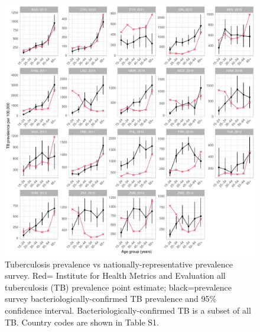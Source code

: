 \documentclass[12pt]{article}
\begin{document}
\begin{figure}
\centering
\includegraphics[width=1\textwidth]{../plots/aF3.pdf}
\caption[Prevalence vs prevalence survey.]{Tuberculosis prevalence vs
  nationally-representative prevalence survey. Red= Institute for Health Metrics
  and Evaluation all tuberculosis (TB) prevalence point
  estimate; black=prevalence survey bacteriologically-confirmed TB prevalence
  and 95\% confidence interval. Bacteriologically-confirmed TB is a subset of
  all TB. Country codes are shown in Table S1.}
\end{figure}

\FloatBarrier
\end{document}
